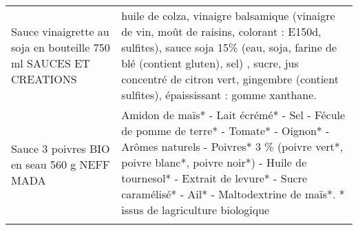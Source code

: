 \begin{longtable}{p{5cm}p{10cm}}
                                        Sauce vinaigrette au soja en bouteille 750 ml SAUCES ET CREATIONS &                                                                                                                                                                                                                                                                                                                                                                                                                                                                                                                                                                                                                                                                                                                                                                huile de colza, vinaigre balsamique (vinaigre de vin, moût de raisins, colorant : E150d, sulfites), sauce soja 15\% (eau, soja, farine de blé (contient gluten), sel) , sucre, jus concentré de citron vert, gingembre (contient sulfites), épaississant : gomme xanthane. \\
                                                              Sauce 3 poivres BIO en seau 560 g NEFF MADA &                                                                                                                                                                                                                                                                                                                                                                                                                                                                                                                                                                                                                                                                                                                                   Amidon de maïs* - Lait écrémé* - Sel - Fécule de pomme de terre* - Tomate* - Oignon* - Arômes naturels - Poivres* 3 \% (poivre vert*, poivre blanc*, poivre noir*) - Huile de tournesol* - Extrait de levure* - Sucre caramélisé* - Ail* - Maltodextrine de maïs*.  * issus de lagriculture biologique \\

\end{longtable}
